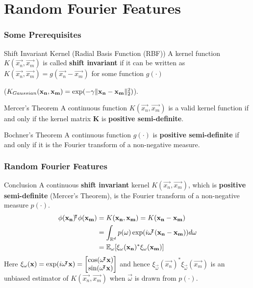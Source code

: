 \documentclass[10pt]{../formats/RU}
\begin{document}
\section{Random Fourier Features}
\begin{frame}
\frametitle{Some Prerequisites}
\begin{alertblock}{Shift Invariant Kernel (Radial Basis Function (RBF))}
  A kernel function $K(\vec{x_n}, \vec{x_m})$ is called \textbf{shift invariant} if it can be written as $K(\vec{x_n}, \vec{x_m}) = g(\vec{x_n}-\vec{x_m})$ for some function $g(\cdot)$
  
  (\eg $K_{Gaussian}(\mathbf{x_n},\mathbf{x_m})=\exp(-\gamma\lVert\mathbf{x_n}-\mathbf{x_m}\rVert_2^2)$).
\end{alertblock}
\begin{block}{Mercer’s Theorem}
  A continuous function $K(\vec{x_n}, \vec{x_m})$ is a valid kernel function if and only if the kernel matrix $\mathbf{K}$ is \textbf{positive semi-definite}.
\end{block}
\begin{block}{Bochner's Theorem}
  A continuous function $g(\cdot)$ is \textbf{positive semi-definite} if and only if it is the Fourier transform of a non-negative measure.
\end{block}
\end{frame}
\begin{frame}
  \frametitle{Random Fourier Features}
  \begin{exampleblock}{Conclusion}
    A continuous \textbf{shift invariant} kernel $K(\vec{x_n}, \vec{x_m})$, which is \textbf{positive semi-definite} (Mercer's Theorem), is the Fourier transform of a non-negative measure $p(\cdot)$.
    \begin{align}
      \phi(\vec{x_n})\trn\phi(\vec{x_m})
      &= K(\vec{x_n}, \vec{x_m}) = K(\vec{x_n}-\vec{x_m}) \\
      &=\int_{\R^d}p(\vec{\omega})\exp(i\vec{\omega}\trn(\vec{x_n}-\vec{x_m}))d\vec{\omega} \\
      &= \mathbb{E}_{\vec{\omega}}\bracks*{\xi_{\vec{\omega}}(\vec{x_n})^*\xi_{\vec{\omega}}(\vec{x_m})}\label{rffinC}
    \end{align}
    Here 
    $
    \xi_{\mathbf{\omega}}(\mathbf{x})=\exp(i\mathbf{\omega}{}^{\mkern-4mu\intercal}\mathbf{x})
    ={
      \begin{bmatrix}
        \cos(\mathbf{\omega}{}^{\mkern-4mu\intercal}\mathbf{x}) \\
        \sin(\mathbf{\omega}{}^{\mkern-4mu\intercal}\mathbf{x})
      \end{bmatrix}
    }
    $ 
    and hence $\xi_{\vec{\omega}}(\vec{x_n})^*\xi_{\vec{\omega}}(\vec{x_m})$ is an unbiased estimator of $K(\vec{x_n}, \vec{x_m})$ when $\vec{\omega}$ is drawn from $p(\cdot)$.
  \end{exampleblock}
\end{frame}
\end{document}
